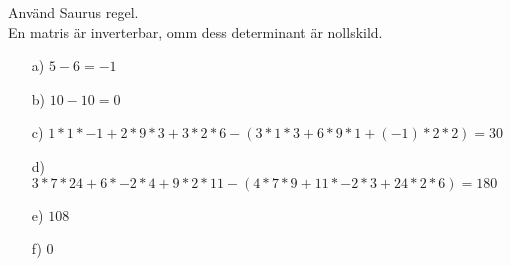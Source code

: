 Använd Saurus regel.\\
En matris är inverterbar, omm dess determinant är nollskild.
\begin{itemize}
	\item[a) ] $5-6=-1$
	\item[b) ] $10-10=0$
	\item[c) ] $1*1*-1+2*9*3+3*2*6-(3*1*3+6*9*1+(-1)*2*2)=30$
	\item[d) ] $3*7*24+6*-2*4+9*2*11-(4*7*9+11*-2*3+24*2*6)=180$
	\item[e) ] $108 $
	\item[f) ] $0 $
\end{itemize}